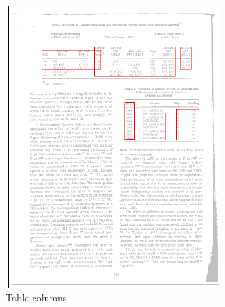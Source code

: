 \begin{figure}[t]
\begin{subfigure}{0.31\textwidth}
\includegraphics[width=\linewidth]{img/tableDetection/tableDetectionTabCols.pdf}
\caption{Table columns}
\label{fig:tessTableDet4}
\end{subfigure}
\begin{subfigure}{0.31\textwidth}

\end{subfigure}
\end{figure}
